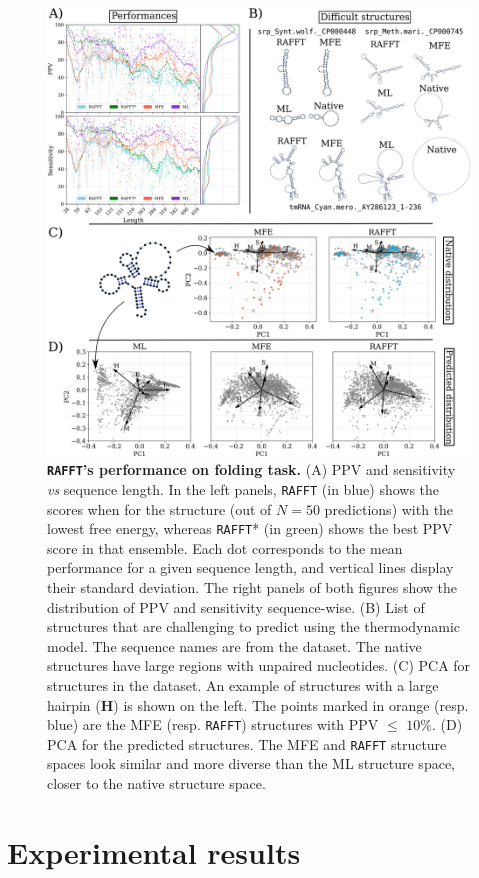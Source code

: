 \begin{figure}[t!]
	\centering
	\includegraphics[width=.9\linewidth]{../res/images/rafft/perf_illed.png}
	\caption{\label{perf_fig} \textbf{\texttt{RAFFT}'s performance on folding task.} (A) PPV and sensitivity \emph{vs} sequence length. In the left panels, \texttt{RAFFT} (in blue) shows the scores when for the structure (out of $N=50$ predictions) with the lowest free energy, whereas \texttt{RAFFT}* (in green) shows the best PPV score in that ensemble. Each dot corresponds to the mean performance for a given sequence length, and vertical lines display their standard deviation. The right panels of both figures show the distribution of PPV and sensitivity sequence-wise. (B) List of structures that are challenging to predict using the thermodynamic model. The sequence names are from the dataset. The native structures have large regions with unpaired nucleotides. (C) PCA for structures in the dataset. An example of structures with a large hairpin (\textbf{H}) is shown on the left. The points marked in orange (resp. blue) are the MFE (resp. \texttt{RAFFT}) structures with PPV \(\leq\) \(10\%\). (D) PCA for the predicted structures. The MFE and \texttt{RAFFT} structure spaces look similar and more diverse than the ML structure space, closer to the native structure space.}
\end{figure}

\section{Experimental results}
